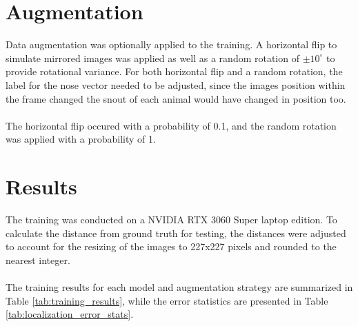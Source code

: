 \documentclass[letterpaper,11pt]{article}
\begin{document}
\section{Augmentation}
Data augmentation was optionally applied to the training. A horizontal flip to simulate mirrored images was applied as well as a random rotation of $\pm10 ^{\circ}$ to provide rotational variance. For both horizontal flip and a random rotation, the label for the nose vector needed to be adjusted, since the images position within the frame changed the snout of each animal would have changed in position too.\\
\\
The horizontal flip occured with a probability of 0.1, and the random rotation was applied with a probability of 1.

\newpage
\section{Results}
The training was conducted on a NVIDIA RTX 3060 Super laptop edition. To calculate the distance from ground truth for testing, the distances were adjusted to account for the resizing of the images to 227x227 pixels and rounded to the nearest integer.\\
\\
The training results for each model and augmentation strategy are summarized in Table \ref{tab:training_results}, while the error statistics are presented in Table \ref{tab:localization_error_stats}.
\end{document}
